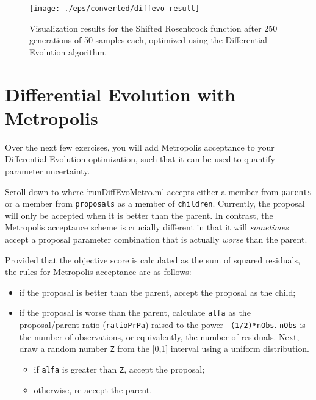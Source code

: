 \begin{figure}[htbp]
  \centering
    \texttt{[image: ./eps/converted/diffevo-result]}
  \caption{Visualization results for the Shifted Rosenbrock function after 250
  generations of 50 samples each, optimized using the Differential Evolution
  algorithm.}
  \label{fig:diffevo-result}
\end{figure}







\section{Differential Evolution with Metropolis}

Over the next few exercises, you will add Metropolis acceptance to your
Differential Evolution optimization, such that it can be used to quantify parameter
uncertainty.


Scroll down to where `runDiffEvoMetro.m' accepts either a member from
\texttt{parents} or a member from \texttt{proposals} as a member of
\texttt{children}. Currently, the proposal will only be accepted when it is
better than the parent. In contrast, the Metropolis acceptance scheme is
crucially different in that it will \textit{sometimes} accept a proposal parameter
combination that is actually \textit{worse} than the parent. 

Provided that the objective score is calculated as the sum of squared residuals,
the rules for Metropolis acceptance are as follows:
\begin{itemize}
    \item{if the proposal is better than the parent, accept the proposal as the
    child;}
    \item{if the proposal is worse than the parent, calculate \texttt{alfa} as the
    proposal/parent ratio (\texttt{ratioPrPa}) raised to the power
    \texttt{-(1/2)*nObs}. \texttt{nObs} is the number of observations, or
    equivalently, the number of residuals. Next, draw a random number \texttt{Z}
    from the [0,1] interval using a uniform distribution.}
    \begin{itemize}
        \item{if \texttt{alfa} is greater than \texttt{Z}, accept the proposal;}
        \item{otherwise, re-accept the parent.}
    \end{itemize}
\end{itemize}

